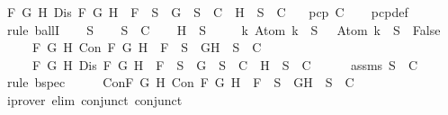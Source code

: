 \begin{isabellebody}
{\isasymand}\ {\isacharparenleft}{\isasymforall}F\ G\ H{\isachardot}\ Dis\ F\ G\ H\ {\isasymlongrightarrow}\ F\ {\isasymin}\ S\ {\isasymlongrightarrow}\ {\isacharbraceleft}G{\isacharbraceright}\ {\isasymunion}\ S\ {\isasymin}\ C\ {\isasymor}\ {\isacharbraceleft}H{\isacharbraceright}\ {\isasymunion}\ S\ {\isasymin}\ C{\isacharparenright}{\isachardoublequoteclose}\isanewline
\ \ \ {\isachardoublequoteopen}pcp\ C{\isachardoublequoteclose}\isanewline
%
\isadelimproof
\ \ %
\endisadelimproof
%
\isatagproof
{}\isamarkupfalse%
\ pcp{\isacharunderscore}def\isanewline
{}\isamarkupfalse%
\ {\isacharparenleft}rule\ ballI{\isacharparenright}\isanewline
\ \ \isamarkupfalse%
\ S\isanewline
\ \ \isamarkupfalse%
\ {\isachardoublequoteopen}S\ {\isasymin}\ C{\isachardoublequoteclose}\isanewline
\ \ \isamarkupfalse%
\ H{\isacharcolon}{\isachardoublequoteopen}{\isasymbottom}\ {\isasymnotin}\ S\isanewline
\ \ \ \ {\isasymand}\ {\isacharparenleft}{\isasymforall}k{\isachardot}\ Atom\ k\ {\isasymin}\ S\ {\isasymlongrightarrow}\ \isactrlbold {\isasymnot}\ {\isacharparenleft}Atom\ k{\isacharparenright}\ {\isasymin}\ S\ {\isasymlongrightarrow}\ False{\isacharparenright}\isanewline
\ \ \ \ {\isasymand}\ {\isacharparenleft}{\isasymforall}F\ G\ H{\isachardot}\ Con\ F\ G\ H\ {\isasymlongrightarrow}\ F\ {\isasymin}\ S\ {\isasymlongrightarrow}\ {\isacharbraceleft}G{\isacharcomma}H{\isacharbraceright}\ {\isasymunion}\ S\ {\isasymin}\ C{\isacharparenright}\isanewline
\ \ \ \ {\isasymand}\ {\isacharparenleft}{\isasymforall}F\ G\ H{\isachardot}\ Dis\ F\ G\ H\ {\isasymlongrightarrow}\ F\ {\isasymin}\ S\ {\isasymlongrightarrow}\ {\isacharbraceleft}G{\isacharbraceright}\ {\isasymunion}\ S\ {\isasymin}\ C\ {\isasymor}\ {\isacharbraceleft}H{\isacharbraceright}\ {\isasymunion}\ S\ {\isasymin}\ C{\isacharparenright}{\isachardoublequoteclose}\isanewline
\ \ \ \ \isamarkupfalse%
\ assms\ {\isacartoucheopen}S\ {\isasymin}\ C{\isacartoucheclose}\ \isamarkupfalse%
\ {\isacharparenleft}rule\ bspec{\isacharparenright}\isanewline
\ \ \isamarkupfalse%
\ \isamarkupfalse%
\ Con{\isacharcolon}{\isachardoublequoteopen}{\isasymforall}F\ G\ H{\isachardot}\ Con\ F\ G\ H\ {\isasymlongrightarrow}\ F\ {\isasymin}\ S\ {\isasymlongrightarrow}\ {\isacharbraceleft}G{\isacharcomma}H{\isacharbraceright}\ {\isasymunion}\ S\ {\isasymin}\ C{\isachardoublequoteclose}\isanewline
\ \ \ \ \isamarkupfalse%
\ {\isacharparenleft}iprover\ elim{\isacharcolon}\ conjunct{}\ conjunct{}{\isacharparenright}\isanewline

\end{isabellebody}
